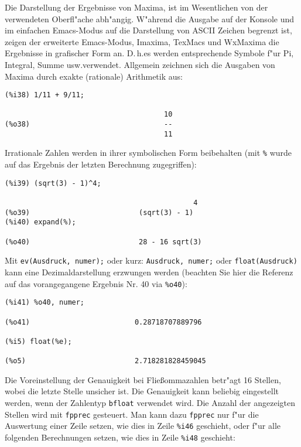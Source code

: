\documentclass[ngerman,12pt,a4paper]{article}
\begin{document}
Die Darstellung der Ergebnisse von Maxima, ist im Wesentlichen von der verwendeten Oberfl"ache abh"angig. W"ahrend die Ausgabe auf der Konsole und im einfachen Emacs-Modus auf die Darstellung von ASCII Zeichen begrenzt ist, zeigen der erweiterte Emacs-Modus, Imaxima, TexMacs und WxMaxima die Ergebnisse in grafischer Form an. D.\,h.\@ es werden entsprechende Symbole f"ur Pi, Integral, Summe usw.\@ verwendet.
Allgemein zeichnen sich die Ausgaben von Maxima durch exakte (rationale) Arithmetik aus:

\scriptsize
\begin{verbatim}
(%i38) 1/11 + 9/11;

                                      10
(%o38)                                --
                                      11
\end{verbatim}
\normalsize

Irrationale Zahlen werden in ihrer symbolischen Form beibehalten (mit \verb|%| wurde auf das Ergebnis der letzten Berechnung zugegriffen):

\scriptsize
\begin{verbatim}
(%i39) (sqrt(3) - 1)^4;

                                             4
(%o39)                          (sqrt(3) - 1)
(%i40) expand(%);

(%o40)                          28 - 16 sqrt(3)
\end{verbatim}
\normalsize

Mit \verb|ev(Ausdruck, numer);| oder kurz: \verb|Ausdruck, numer;| oder \verb|float(Ausdruck)| kann eine Dezimaldarstellung erzwungen werden (beachten Sie hier die Referenz auf das vorangegangene Ergebnis Nr. 40 via \verb|%o40|):

\scriptsize
\begin{verbatim}
(%i41) %o40, numer;

(%o41)                         0.28718707889796

(%i5) float(%e);

(%o5)                          2.718281828459045
\end{verbatim}
\normalsize

Die Voreinstellung der Genauigkeit bei Flie{\ss}ommazahlen betr"agt 16 Stellen, wobei die letzte Stelle unsicher ist. Die Genauigkeit kann beliebig eingestellt werden, wenn der Zahlentyp \verb|bfloat| verwendet wird. Die Anzahl der angezeigten Stellen wird mit \verb|fpprec| gesteuert. Man kann dazu \verb|fpprec| nur f"ur die Auswertung einer Zeile setzen, wie dies in Zeile \verb|%i46| geschieht, oder f"ur alle folgenden Berechnungen setzen, wie dies in Zeile \verb|%i48| geschieht:
\end{document}
